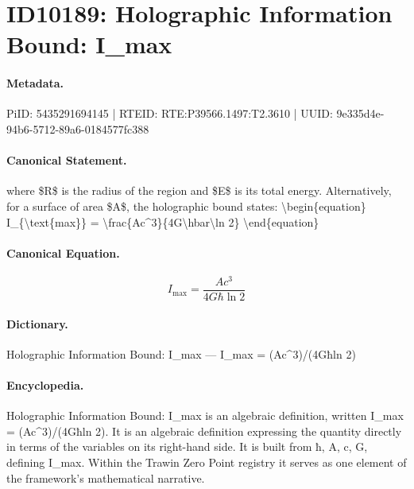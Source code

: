 \section*{ID10189: Holographic Information Bound: I\_max}
\paragraph{Metadata.}
PiID: 5435291694145 | RTEID: RTE:P39566.1497:T2.3610 | UUID: 9e335d4e-94b6-5712-89a6-0184577fc388

\paragraph{Canonical Statement.}
where \$R\$ is the radius of the region and \$E\$ is its total energy. Alternatively, for a surface of area \$A\$, the holographic bound states: \textbackslash{}begin\{equation\} I\_\{\textbackslash{}text\{max\}\} = \textbackslash{}frac\{Ac\textasciicircum{}3\}\{4G\textbackslash{}hbar\textbackslash{}ln 2\} \textbackslash{}end\{equation\}

\paragraph{Canonical Equation.}
\[
I_{\text{max}} = \frac{Ac^3}{4G\hbar\ln 2}
\]

\paragraph{Dictionary.}
Holographic Information Bound: I\_max — I\_max = (Ac\textasciicircum{}3)/(4Għln 2)

\paragraph{Encyclopedia.}
Holographic Information Bound: I\_max is an algebraic definition, written I\_max = (Ac\textasciicircum{}3)/(4Għln 2). It is an algebraic definition expressing the quantity directly in terms of the variables on its right-hand side. It is built from ħ, A, c, G, defining I\_max. Within the Trawin Zero Point registry it serves as one element of the framework's mathematical narrative.
